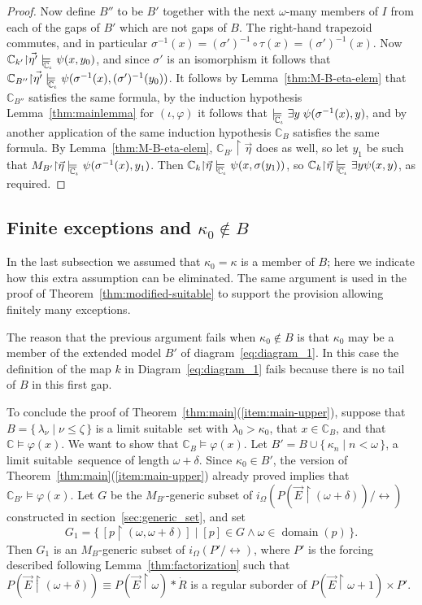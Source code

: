\documentclass[
twoside,
]{article}
\theoremstyle{definition}
\theoremstyle{remark}
\newcommand{\etarestrict}{\restrict}
\newcommand{\modelsCi}{\models_{\!\!\!\!\!\lower.7ex\hbox{$\scriptstyle\chang_\iota$}}}\newcommand{\fvia}[4]{f^{#1}_{#2(#3)#4}}
\newcommand{\xre}{\etarestrict\vec\eta{}}
\newcommand{\xrep}{\etarestrict\vetap}
\newcommand{\vetap}{\vec{\eta'}}
\newcommand{\LS}{limit suitable}
\newcommand{\ords}{\Omega}
\newcommand\gkeq{\leftrightarrow}
\newcommand\mgkeq{/{\gkeq}}
\renewcommand{\phi}{\varphi}
\newcommand{\set}[1]{\{\,#1\,\}}
\newcommand{\restrict}{{\upharpoonright}}
\DeclareMathOperator{\domain}{domain}
\newcommand\chang{\mathbb{C}}
\begin{document}
\begin{proof}
  Now define $B''$ to be $B'$ together with the next $\omega$-many
  members of $I$ from each of the gaps of $B'$ which are not gaps of
  $B$.
  The right-hand trapezoid commutes, and in particular
  $\sigma^{-1}(x)=(\sigma')^{-1}\circ \tau(x)=(\sigma')^{-1}(x)$.    Now
  $\chang_{k'}\xrep\modelsCi \psi(x,y_0)$, and since $\sigma'$
  is an isomorphism it follows that
  $\chang_{B''}\xrep\modelsCi\psi(\sigma^{-1}(x),(\sigma')^{-1}(y_0))$.
  It follows by Lemma~\ref{thm:M-B-eta-elem} that $\chang_{B''}$ satisfies the
  same formula,  by the induction hypothesis Lemma~\ref{thm:mainlemma} for
  $(\iota,\phi)$ it follows that $\modelsCi\exists
  y\;\psi(\sigma^{-1}(x),y)$, and by 
  another application of the same
  induction hypothesis $\chang_B$ satisfies the same formula.
  By Lemma~\ref{thm:M-B-eta-elem},  $\chang_{B'}\etarestrict\vec\eta$
  does as well, so   let $y_1$ be such that $M_{B'}\xre\modelsCi\psi(\sigma^{-1}(x),y_1)$.  Then   
  $\chang_k\xre\modelsCi \psi(x,\sigma(y_1))$, so $\chang_k\xre\modelsCi\exists y\psi(x,y)$, as required.
\end{proof}





\subsection{ Finite exceptions and  $\kappa_0\notin B$}\label{sec:finite-exceptions}
In the last subsection we assumed that $\kappa_0=\kappa$ is a member
of $B$;  here we indicate how this extra assumption can be eliminated.  The
same argument is used in the proof of
Theorem~\ref{thm:modified-suitable}  to support the provision allowing finitely many exceptions.


The reason that the previous argument fails when $\kappa_0\notin B$ is that $\kappa_0$ may be a member of the extended model $B'$ of diagram~\ref{eq:diagram_1}.   In this case the definition of  
the map $k$ in Diagram~\eqref{eq:diagram_1} fails because there is no tail of $B$ in this first gap.

To conclude the proof of Theorem~\ref{thm:main}(\ref{item:main-upper}), 
suppose that $B=\set{\lambda_\nu\mid\nu\leq\zeta}$ is a \LS\ set
with $\lambda_0>\kappa_0$, that 
$x\in\chang_{B}$, and that $\chang\models\phi(x)$.    We want to show
that $\chang_{B}\models\phi(x)$.  
Let $B'=B\cup\set{\kappa_{n}\mid n<\omega}$, a \LS\ sequence of length $\omega+\delta$.   
Since $\kappa_0\in B'$,  the version of
Theorem~\ref{thm:main}(\ref{item:main-upper})
already proved implies
that $\chang_{B'}\models\phi(x)$.
Let $G$ be the $M_{B'}$-generic subset of 
$i_\ords(P(\vec E\restrict(\omega+\delta))\mgkeq)$ constructed 
in section~\ref{sec:generic_set},
and set \[G_1=\set{[p\restrict(\omega,\omega+\delta)]\mid [p]
  \in G \land \omega\in\domain(p)}. \]
Then $G_1$ is an $M_B$-generic subset of 
$i_\ords(P'\mgkeq)$, where $P'$ is the forcing described following
Lemma~\ref{thm:factorization} such that $P(\vec
E\restrict(\omega+\delta))\equiv P(\vec
E\restrict\omega)*\dot R$ is a regular suborder of  
$P(\vec E\restrict\omega+1)\times P'$.
\end{document}
